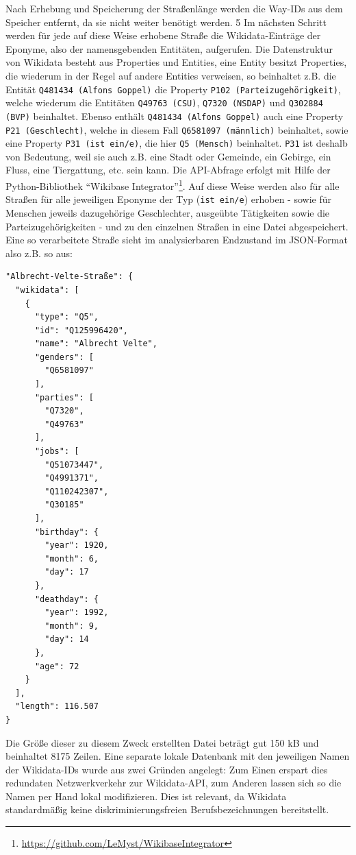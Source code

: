 \documentclass[ngerman,twocolumn,showpacs,%
  nofootinbib,aps,superscriptaddress,%
  eqsecnum,prd,notitlepage,showkeys,10pt,report]{revtex4-2}
\begin{document}
Nach Erhebung und Speicherung der Straßenlänge werden die Way-IDs aus dem Speicher
entfernt, da sie nicht weiter benötigt werden.
5
Im nächsten Schritt werden für jede auf diese Weise erhobene Straße die Wikidata-Einträge
der Eponyme, also der namensgebenden Entitäten, aufgerufen.
Die Datenstruktur von Wikidata besteht aus Properties und Entities, eine Entity besitzt
Properties, die wiederum in der Regel auf andere Entities verweisen, so beinhaltet z.B. die
Entität \texttt{Q481434 (Alfons Goppel)} die Property \texttt{P102 (Parteizugehörigkeit)}, welche wiederum
die Entitäten \texttt{Q49763 (CSU)}, \texttt{Q7320 (NSDAP)} und \texttt{Q302884 (BVP)} beinhaltet. Ebenso
enthält \texttt{Q481434 (Alfons Goppel)} auch eine Property \texttt{P21 (Geschlecht)}, welche in diesem
Fall \texttt{Q6581097 (männlich)} beinhaltet, sowie eine Property \texttt{P31 (ist ein/e)}, die hier \texttt{Q5
(Mensch)} beinhaltet. \texttt{P31} ist deshalb von Bedeutung, weil sie auch z.B. eine Stadt oder
Gemeinde, ein Gebirge, ein Fluss, eine Tiergattung, etc. sein kann. Die API-Abfrage erfolgt
mit Hilfe der Python-Bibliothek “Wikibase Integrator”\footnote{\url{https://github.com/LeMyst/WikibaseIntegrator}}.
Auf diese Weise werden also für alle Straßen für alle jeweiligen Eponyme der Typ (\texttt{ist
ein/e}) erhoben - sowie für Menschen jeweils dazugehörige Geschlechter, ausgeübte
Tätigkeiten sowie die Parteizugehörigkeiten - und zu den einzelnen Straßen in eine Datei
abgespeichert.
Eine so verarbeitete Straße sieht im analysierbaren Endzustand im JSON-Format also z.B.
so aus:
\begin{lstlisting}
"Albrecht-Velte-Straße": {
  "wikidata": [
    {
      "type": "Q5",
      "id": "Q125996420",
      "name": "Albrecht Velte",
      "genders": [
        "Q6581097"
      ],
      "parties": [
        "Q7320",
        "Q49763"
      ],
      "jobs": [
        "Q51073447",
        "Q4991371",
        "Q110242307",
        "Q30185"
      ],
      "birthday": {
        "year": 1920,
        "month": 6,
        "day": 17
      },
      "deathday": {
        "year": 1992,
        "month": 9,
        "day": 14
      },
      "age": 72
    }
  ],
  "length": 116.507
}
\end{lstlisting}

Die Größe dieser zu diesem Zweck erstellten Datei beträgt gut 150 kB und beinhaltet 8175
Zeilen. Eine separate lokale Datenbank mit den jeweiligen Namen der Wikidata-IDs wurde aus zwei Gründen angelegt:
Zum Einen erspart dies redundaten Netzwerkverkehr zur Wikidata-API, zum Anderen lassen sich so die Namen per Hand
lokal modifizieren. Dies ist relevant, da Wikidata standardmäßig keine diskriminierungsfreien Berufsbezeichnungen bereitstellt.
\end{document}
